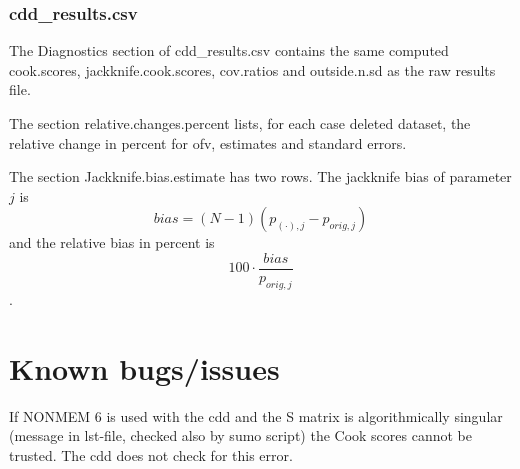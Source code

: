 \subsubsection*{cdd\_results.csv}
The Diagnostics section of
cdd\_results.csv contains the same computed cook.scores, jackknife.cook.scores, cov.ratios and
outside.n.sd as the raw results file.

The section relative.changes.percent lists, for each case deleted dataset, the relative change in percent
for ofv, estimates and standard errors.

The section Jackknife.bias.estimate
has two rows. The jackknife bias of parameter $j$ is \[bias=\left(N-1\right)\left(p_{(\cdot),j}-p_{orig,j}\right) \]
and the relative bias in percent is \[100\cdot\frac{bias}{p_{orig,j}}\].

\section{Known bugs/issues}

If NONMEM 6 is used with the cdd and the S matrix is algorithmically singular (message in lst-file, checked also by sumo script) the Cook 
scores cannot be trusted. The cdd does not check for this error. 


